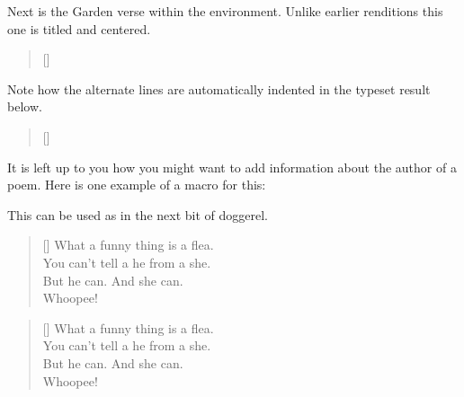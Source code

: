 \vspace{\onelineskip}

    Next is the Garden verse within the  environment. Unlike
earlier renditions this one is titled and centered. 
\begin{lcode}
\settowidth{\versewidth}{But now my love is dead}
\begin{verse}[\versewidth]
\begin{altverse}
\garden
\end{altverse}
\end{verse}
\end{lcode}
Note how the alternate lines 
are automatically indented in the typeset result below.

\settowidth{\versewidth}{But now my love is dead}
\begin{verse}[\versewidth]
\begin{altverse}
\garden
\end{altverse}
\end{verse}

\vspace{\onelineskip}

It is left up to you how you might want to add information about
the author of a poem. Here is one example of a 
macro for this:
\begin{lcode}
\newcommand{\attrib}[1]{%
   \nopagebreak{\raggedleft\footnotesize #1\par}}
\end{lcode}
\providecommand{\attrib}[1]{%
   \nopagebreak{\raggedleft\footnotesize #1\par}}

   This can be used as in the next bit of doggerel.
\begin{lcode}
\settowidth{\versewidth}{What a funny thing is a flea}
\begin{verse}[\versewidth]
What a funny thing is a flea. \\
You can't tell a he from a she. \\
But he can. And she can. \\
Whoopee!
\end{verse}
\attrib{Anonymous}
\end{lcode}

\settowidth{\versewidth}{What a funny thing is a flea}
\begin{verse}[\versewidth]
What a funny thing is a flea. \\
You can't tell a he from a she. \\
But he can. And she can. \\
Whoopee!
\end{verse}
\attrib{Anonymous}

